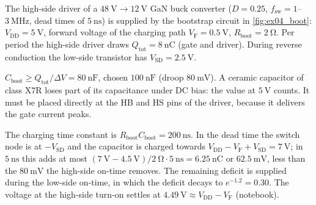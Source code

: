 

The high-side driver of a $\SI{48}{\volt}\rightarrow\SI{12}{\volt}$ GaN buck converter ($D=0.25$, $f_\mathrm{sw}=1$--$\SI{3}{\mega\hertz}$, dead times of $\SI{5}{\nano\second}$) is supplied by the bootstrap circuit in \autoref{fig:ex04_boot}: $V_\mathrm{DD}=\SI{5}{\volt}$, forward voltage of the charging path $V_\mathrm{F}=\SI{0.5}{\volt}$, $R_\mathrm{boot}=\SI{2}{\ohm}$. Per period the high-side driver draws $Q_\mathrm{tot}=\SI{8}{\nano\coulomb}$ (gate and driver). During reverse conduction the low-side transistor has $V_\mathrm{SD}=\SI{2.5}{\volt}$.




\begin{solutionblock}
	$C_\mathrm{boot}\geq Q_\mathrm{tot}/\Delta V=\SI{80}{\nano\farad}$, chosen $\SI{100}{\nano\farad}$ (droop $\SI{80}{\milli\volt}$). A ceramic capacitor of class X7R loses part of its capacitance under DC bias: the value at $\SI{5}{\volt}$ counts. It must be placed directly at the HB and HS pins of the driver, because it delivers the gate current peaks.
\end{solutionblock}


\begin{solutionblock}
	The charging time constant is $R_\mathrm{boot}C_\mathrm{boot}=\SI{200}{\nano\second}$. In the dead time the switch node is at $-V_\mathrm{SD}$ and the capacitor is charged towards $V_\mathrm{DD}-V_\mathrm{F}+V_\mathrm{SD}=\SI{7}{\volt}$; in $\SI{5}{\nano\second}$ this adds at most $(\SI{7}{\volt}-\SI{4.5}{\volt})/\SI{2}{\ohm}\cdot\SI{5}{\nano\second}=\SI{6.25}{\nano\coulomb}$ or $\SI{62.5}{\milli\volt}$, less than the $\SI{80}{\milli\volt}$ the high-side on-time removes. The remaining deficit is supplied during the low-side on-time, in which the deficit decays to $e^{-1.2}=0.30$. The voltage at the high-side turn-on settles at $\SI{4.49}{\volt}\approx V_\mathrm{DD}-V_\mathrm{F}$ (notebook).
\end{solutionblock}

